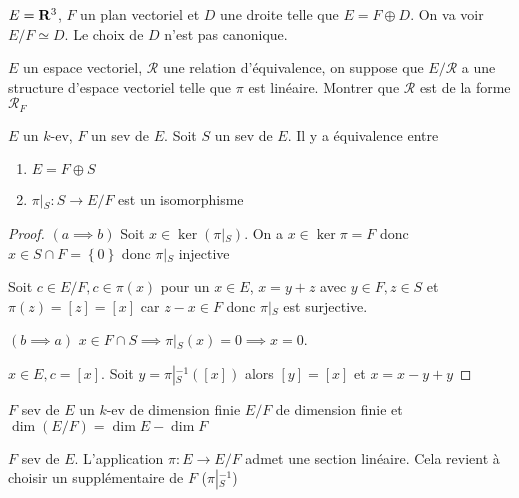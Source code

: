\begin{ex}
$E=\mathbf R^3$, $F$ un plan vectoriel et  $D$ une droite telle que  $E=F\oplus D$. On va voir  $E / F \simeq D$. Le choix de  $D$ n'est pas canonique.
\end{ex}

\begin{exo}
$E$ un espace vectoriel, $\mathcal  R$ une relation d'équivalence, on suppose que $E / \mathcal  R$ a une structure d'espace vectoriel telle que $\pi$ est linéaire. Montrer que $\mathcal  R$ est de la forme $\mathcal  R_F$
\end{exo}

\begin{thm}
$E$ un  $k$-ev, $F$ un sev de $E$. Soit  $S$ un sev de  $E$. Il y a équivalence entre  \begin{enumerate}
    \item $E=F\oplus S$ 
    \item $\pi \left|_{S}\right.:S \longrightarrow E / F$ est un isomorphisme
\end{enumerate}
\end{thm}

\begin{proof}
    $(a \implies b)$ Soit $x \in  \ker(\pi\left|_S\right.)$. On a $x \in  \ker \pi = F$ donc $x \in  S\cap F= \left\{  0 \right\}$ donc $\pi\left|_S\right.$ injective

    Soit $c \in  E / F, c \in  \pi(x)$ pour un $x \in  E$, $x=y+z$ avec  $y \in  F, z \in  S$ et $\pi(z)=[z]=[x]$ car $z-x \in  F$ donc $\pi\left|_S\right.$ est surjective.

$(b \implies  a)$ $x \in  F \cap S \implies  \pi\left|_S\right.(x)=0 \implies  x=0$.

$x \in  E, c = [x]$. Soit $y=\pi\left|_S^{-1}\right.([x])$ alors $[y]=[x]$ et  $x=x-y+y$
\end{proof}

\begin{thm}
\Hyp $F$ sev de  $E$ un  $k$-ev de dimension finie
\Conc $E / F$ de dimension finie et $\dim(E / F)=\dim E-\dim F$
\end{thm}

\begin{rem}
    $F$ sev de  $E$. L'application  $\pi:E \longrightarrow E / F$ admet une section linéaire. Cela revient à choisir un supplémentaire de $F$ ($\pi\left|_S^{-1}\right.$)
\end{rem}

